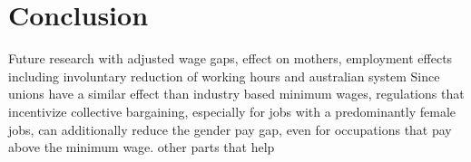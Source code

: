 \documentclass[12pt,draft,a4paper]{article}
\begin{document}
\section{Conclusion}

Future research with adjusted wage gaps, effect on mothers, employment effects including involuntary reduction of working hours and australian system
Since unions have a similar effect than industry based minimum wages, regulations that incentivize collective bargaining, especially for jobs with a predominantly female jobs, can additionally reduce the gender pay gap, even for occupations that pay above the minimum wage.
other parts that help 
\newpage

% 

\end{document}
